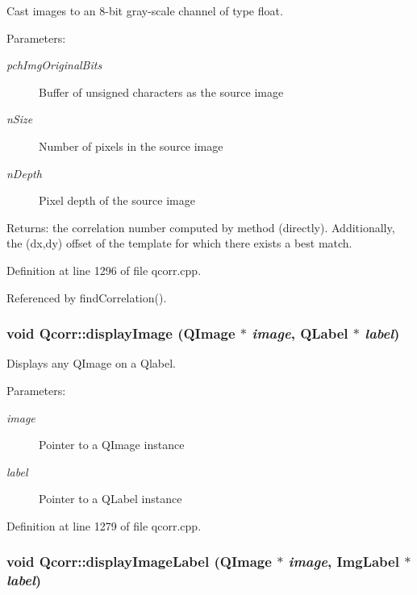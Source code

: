 Cast images to an 8-bit gray-scale channel of type float. 

\begin{Desc}
\item[Parameters:]
\begin{description}
\item[{\em pchImgOriginalBits}]Buffer of unsigned characters as the source image \item[{\em nSize}]Number of pixels in the source image \item[{\em nDepth}]Pixel depth of the source image \end{description}
\end{Desc}
\begin{Desc}
\item[Returns:]the correlation number computed by method (directly). Additionally, the (dx,dy) offset of the template for which there exists a best match. \end{Desc}


Definition at line 1296 of file qcorr.cpp.

Referenced by findCorrelation().\hypertarget{classQcorr_925b0715143a0afa981851547f8b9256}{
\subsubsection[{displayImage}]{\setlength{\rightskip}{0pt plus 5cm}void Qcorr::displayImage (QImage $\ast$ {\em image}, \/  QLabel $\ast$ {\em label})}}
\label{classQcorr_925b0715143a0afa981851547f8b9256}


Displays any QImage on a Qlabel. 

\begin{Desc}
\item[Parameters:]
\begin{description}
\item[{\em image}]Pointer to a QImage instance \item[{\em label}]Pointer to a QLabel instance \end{description}
\end{Desc}


Definition at line 1279 of file qcorr.cpp.\hypertarget{classQcorr_fddb022a6024a32be3b47016308d6c50}{
\subsubsection[{displayImageLabel}]{\setlength{\rightskip}{0pt plus 5cm}void Qcorr::displayImageLabel (QImage $\ast$ {\em image}, \/  {\bf ImgLabel} $\ast$ {\em label})}}
\label{classQcorr_fddb022a6024a32be3b47016308d6c50}


